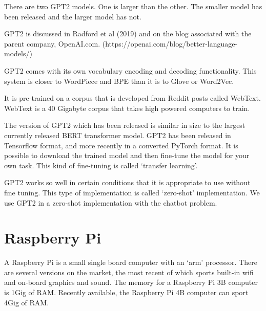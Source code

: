 There are two GPT2 models. One is larger than the other. The smaller model has been released and the larger model has not. 

GPT2 is discussed in Radford et al (2019)\cite{radford2019language} and on the blog associated with the parent company, OpenAI.com. (https://openai.com/blog/better-language-models/)

GPT2 comes with its own vocabulary encoding and decoding functionality. This system is closer to
WordPiece and BPE than it is to Glove or Word2Vec.

It is pre-trained on a corpus that is developed from Reddit posts called WebText. WebText is a
40 Gigabyte corpus that takes high powered computers to train.

The version of GPT2 which has been released is similar in size to the largest currently released 
BERT transformer model. GPT2 has been released in Tensorflow format, and more recently in a converted PyTorch format. It is possible to download the trained model and then fine-tune the model for your own task. This kind of fine-tuning is called `transfer learning'. 

GPT2 works so well in certain conditions that it is appropriate to use without fine tuning. This 
type of implementation is called `zero-shot' implementation. We use GPT2 in a zero-shot implementation with the chatbot problem.

\section{Raspberry Pi}

A Raspberry Pi is a small single board computer with an `arm' processor. There are 
several versions on the market, the most recent of which sports built-in wifi and
on-board graphics and sound. The memory for a Raspberry Pi 3B computer is 1Gig of RAM. Recently
available, the Raspberry Pi 4B computer can sport 4Gig of RAM.

